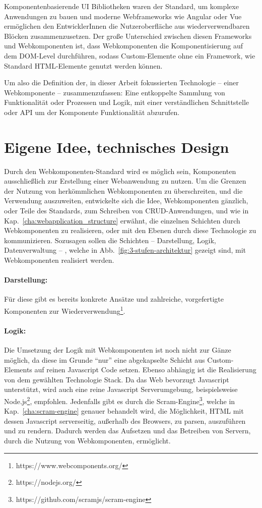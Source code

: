 Komponentenbasierende UI Bibliotheken waren der Standard, um komplexe Anwendungen zu bauen und moderne Webframeworks wie Angular oder Vue ermöglichen den EntwicklerInnen die Nutzeroberfläche aus wiederverwendbaren Blöcken zusammenzusetzen. Der große Unterschied zwischen diesen Frameworks und Webkomponenten ist, dass Webkomponenten die Komponentisierung auf dem DOM-Level durchführen, sodass Custom-Elemente ohne ein Framework, wie Standard HTML-Elemente genutzt werden können. 

Um also die Definition der, in dieser Arbeit fokussierten Technologie -- einer Webkomponente -- zusammenzufassen: Eine entkoppelte Sammlung von Funktionalität oder Prozessen und Logik, mit einer verständlichen Schnittstelle oder API um der Komponente Funktionalität abzurufen.


\section{Eigene Idee, technisches Design}
Durch den Webkomponenten-Standard wird es möglich sein, Komponenten ausschließlich zur Erstellung einer Webanwendung zu nutzen. Um die Grenzen der Nutzung von herkömmlichen Webkomponenten zu überschreiten, und die Verwendung auszuweiten, entwickelte sich die Idee, Webkomponenten gänzlich, oder Teile des Standards, zum Schreiben von CRUD-Anwendungen, und wie in Kap.~\ref{cha:webapplication_structure} erwähnt, die einzelnen Schichten durch Webkomponenten zu realisieren, oder mit den Ebenen durch diese Technologie zu kommunizieren. Sozusagen sollen die Schichten -- Darstellung, Logik, Datenverwaltung -- , welche in Abb.~\ref{fig:3-stufen-architektur} gezeigt sind, mit Webkomponenten realisiert werden. 

\paragraph{Darstellung:}Für diese gibt es bereits konkrete Ansätze und zahlreiche, vorgefertigte Komponenten zur Wiederverwendung\footnote{https://www.webcomponents.org/}.

\paragraph{Logik: }Die Umsetzung der Logik mit Webkomponenten ist noch nicht zur Gänze möglich, da diese im Grunde "`nur"' eine abgekapselte Schicht aus Custom-Elements auf reinen Javascript Code setzen. Ebenso abhängig ist die Realisierung von dem gewählten Technologie Stack. Da das Web bevorzugt Javascript unterstützt, wird auch eine reine Javascript Serverumgebung, beispielsweise Node.js\footnote{https://nodejs.org/}, empfohlen. Jedenfalls gibt es durch die Scram-Engine\footnote{https://github.com/scramjs/scram-engine}, welche in Kap.~\ref{cha:scram-engine} genauer behandelt wird, die Möglichkeit, HTML mit dessen Javascript serverseitig, außerhalb des Browsers, zu parsen, auszuführen und zu rendern. Dadurch werden das Aufsetzen und das Betreiben von Servern, durch die Nutzung von Webkomponenten, ermöglicht.

